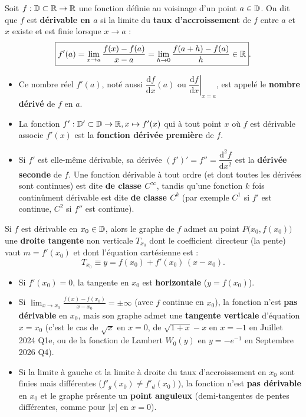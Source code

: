 \begin{definition}
Soit $f : \mathbb{D} \subset \mathbb{R} \to \mathbb{R}$ une fonction définie au voisinage d'un point $a \in \mathbb{D}$. On dit que $f$ est \textbf{dérivable en $a$} si la limite du \textbf{taux d'accroissement} de $f$ entre $a$ et $x$ existe et est finie lorsque $x \to a$ :
\[
    \boxed{f'(a) = \lim_{x \to a} \frac{f(x) - f(a)}{x - a} = \lim_{h \to 0} \frac{f(a+h) - f(a)}{h} \in \mathbb{R}}.
\]
\begin{itemize}
    \item Ce nombre réel $f'(a)$, noté aussi $\dfrac{\mathrm{d}f}{\mathrm{d}x}(a)$ ou $\left.\dfrac{\mathrm{d}f}{\mathrm{d}x}\right|_{x=a}$, est appelé le \textbf{nombre dérivé} de $f$ en $a$.
    \item La fonction $f' : \mathbb{D}' \subset \mathbb{D} \to \mathbb{R}, x \mapsto f'(x)$ qui à tout point $x$ où $f$ est dérivable associe $f'(x)$ est la \textbf{fonction dérivée première} de $f$.
    \item Si $f'$ est elle-même dérivable, sa dérivée $(f')' = f'' = \dfrac{\mathrm{d}^2 f}{\mathrm{d}x^2}$ est la \textbf{dérivée seconde} de $f$. Une fonction dérivable à tout ordre (et dont toutes les dérivées sont continues) est dite \textbf{de classe $C^\infty$}, tandis qu'une fonction $k$ fois continûment dérivable est dite \textbf{de classe $C^k$} (par exemple $C^1$ si $f'$ est continue, $C^2$ si $f''$ est continue).
\end{itemize}
\end{definition}

\begin{theoreme}
Si $f$ est dérivable en $x_0 \in \mathbb{D}$, alors le graphe de $f$ admet au point $P\bigl(x_0, f(x_0)\bigr)$ une \textbf{droite tangente} non verticale $T_{x_0}$ dont le coefficient directeur (la pente) vaut $m = f'(x_0)$ et dont l'équation cartésienne est :
\[
    \boxed{T_{x_0} \equiv y = f(x_0) + f'(x_0)\,(x - x_0)}.
\]
\begin{itemize}
    \item Si $f'(x_0) = 0$, la tangente en $x_0$ est \textbf{horizontale} ($y = f(x_0)$).
    \item Si $\lim_{x \to x_0} \frac{f(x)-f(x_0)}{x-x_0} = \pm\infty$ (avec $f$ continue en $x_0$), la fonction n'est \textbf{pas dérivable} en $x_0$, mais son graphe admet une \textbf{tangente verticale} d'équation $x = x_0$ (c'est le cas de $\sqrt{x}$ en $x=0$, de $\sqrt{1+x}-x$ en $x=-1$ en Juillet 2024 Q1e, ou de la fonction de Lambert $W_0(y)$ en $y = -e^{-1}$ en Septembre 2026 Q4).
    \item Si la limite à gauche et la limite à droite du taux d'accroissement en $x_0$ sont finies mais différentes ($f'_g(x_0) \neq f'_d(x_0)$), la fonction n'est \textbf{pas dérivable} en $x_0$ et le graphe présente un \textbf{point anguleux} (demi-tangentes de pentes différentes, comme pour $|x|$ en $x=0$).
\end{itemize}
\end{theoreme}

